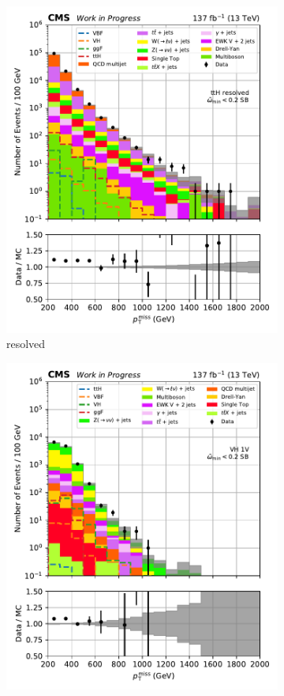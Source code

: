 \begin{figure}[htbp]
\begin{subfigure}[b]{0.24\textwidth}
        \includegraphics[width=\textwidth]{figures/region_plots/2016to18/sideband_3/ttH_resolved.pdf}
        \caption{\ttH resolved}
    \end{subfigure}
    \hfill
    \begin{subfigure}[b]{0.24\textwidth}
        \includegraphics[width=\textwidth]{figures/region_plots/2016to18/sideband_3/VH_1V.pdf}

\end{subfigure}
\end{figure}
